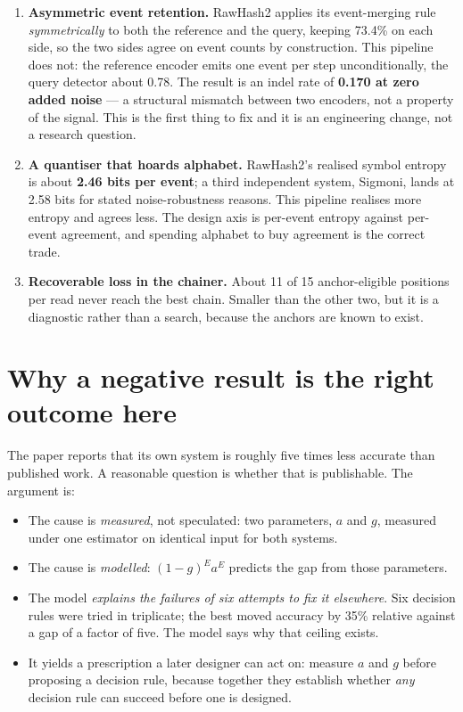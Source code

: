 \documentclass[11pt,a4paper]{article}
\begin{document}
\begin{enumerate}
\item \textbf{Asymmetric event retention.} RawHash2 applies its event-merging rule
      \emph{symmetrically} to both the reference and the query, keeping 73.4\% on each side,
      so the two sides agree on event counts by construction. This pipeline does not: the
      reference encoder emits one event per step unconditionally, the query detector about
      0.78. The result is an indel rate of \textbf{0.170 at zero added noise} --- a structural
      mismatch between two encoders, not a property of the signal. This is the first thing to
      fix and it is an engineering change, not a research question.
\item \textbf{A quantiser that hoards alphabet.} RawHash2's realised symbol entropy is about
      \textbf{2.46 bits per event}; a third independent system, Sigmoni, lands at 2.58 bits
      for stated noise-robustness reasons. This pipeline realises more entropy and agrees
      less. The design axis is per-event entropy against per-event agreement, and spending
      alphabet to buy agreement is the correct trade.
\item \textbf{Recoverable loss in the chainer.} About 11 of 15 anchor-eligible positions per
      read never reach the best chain. Smaller than the other two, but it is a diagnostic
      rather than a search, because the anchors are known to exist.
\end{enumerate}

\section{Why a negative result is the right outcome here}

The paper reports that its own system is roughly five times less accurate than published
work. A reasonable question is whether that is publishable. The argument is:

\begin{itemize}
\item The cause is \emph{measured}, not speculated: two parameters, $a$ and $g$, measured
      under one estimator on identical input for both systems.
\item The cause is \emph{modelled}: $(1-g)^{E}a^{E}$ predicts the gap from those parameters.
\item The model \emph{explains the failures of six attempts to fix it elsewhere}. Six
      decision rules were tried in triplicate; the best moved accuracy by 35\% relative
      against a gap of a factor of five. The model says why that ceiling exists.
\item It yields a prescription a later designer can act on: measure $a$ and $g$ before
      proposing a decision rule, because together they establish whether \emph{any} decision
      rule can succeed before one is designed.
\end{itemize}
\end{document}
